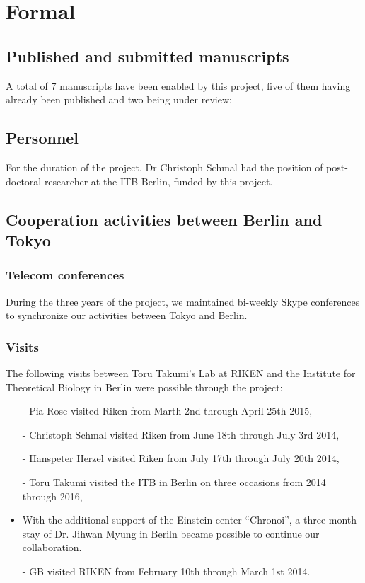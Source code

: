 \documentclass[a4paper]{article}
\begin{document}








\newpage

\section{Formal}

\subsection{Published and submitted manuscripts}
A total of 7 manuscripts have been enabled by this project, five of
them having already been published and two being under review:
\cite{bordyugov2015tuning,schmal2015theoretical,kondoff2015modeling,schmal2017moran,wagner2017plant,myung2017choroid,schmal2017measuring}


\subsection{Personnel}
For the duration of the project, Dr Christoph Schmal had the position
of post-doctoral researcher at the ITB Berlin, funded by this project.

\subsection{Cooperation activities between Berlin and Tokyo}

\subsubsection{Telecom conferences}
During the three years of the project, we maintained bi-weekly Skype
conferences to synchronize our activities between Tokyo and Berlin.

\subsubsection{Visits}
The following visits between Toru Takumi's Lab at RIKEN and the
Institute for Theoretical Biology in Berlin were possible through the
project:
\begin{itemize}
  \item[-] Pia Rose visited Riken from Marth 2nd through April 25th 2015,
  \item[-] Christoph Schmal visited Riken from June 18th through July 3rd
  2014,
  \item[-] Hanspeter Herzel visited Riken from July 17th through July
  20th 2014,
  \item[-] Toru Takumi visited the ITB in Berlin on three occasions from
  2014 through 2016,
  \item With the additional support of the Einstein center
    ``Chronoi'', a three month stay of Dr. Jihwan Myung in Beriln became
    possible to continue our collaboration.
  \item[-] GB visited RIKEN from February 10th through March 1st 2014.
\end{itemize}
\end{document}
